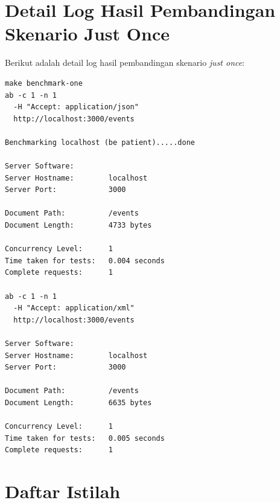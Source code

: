 \documentclass[a4paper, 12pt, oneside]{report}
\begin{document}
\chapter{Detail Log Hasil Pembandingan Skenario Just Once} \label{lampiran:detail-log-hasil-pembandingan-skenario-just-once}

Berikut adalah detail log hasil pembandingan skenario \textit{just once}:

\begin{lstlisting}[frame=single]
make benchmark-one 
ab -c 1 -n 1
  -H "Accept: application/json" 
  http://localhost:3000/events

Benchmarking localhost (be patient).....done

Server Software:        
Server Hostname:        localhost
Server Port:            3000

Document Path:          /events
Document Length:        4733 bytes

Concurrency Level:      1
Time taken for tests:   0.004 seconds
Complete requests:      1

ab -c 1 -n 1
  -H "Accept: application/xml"
  http://localhost:3000/events

Server Software:        
Server Hostname:        localhost
Server Port:            3000

Document Path:          /events
Document Length:        6635 bytes

Concurrency Level:      1
Time taken for tests:   0.005 seconds
Complete requests:      1
\end{lstlisting}

\chapter{Daftar Istilah} \label{lampiran:daftar-istilah}
\end{document}
